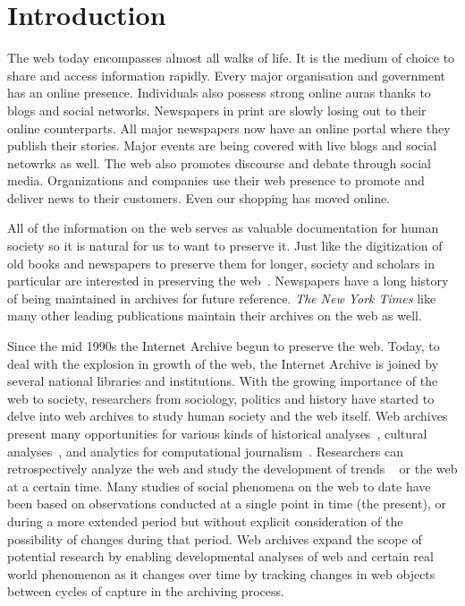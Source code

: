 \chapter{Introduction} %
\label{cha:introduction}


The web today encompasses almost all walks of life. It is the medium of choice to share and access information rapidly. Every major organisation and government has an online presence. Individuals also possess strong online auras thanks to blogs and social networks. Newspapers in print are slowly losing out to their online counterparts. All major newspapers now have an online portal where they publish their stories. Major events are being covered with live blogs and social netowrks as well. The web also promotes discourse and debate through social media. Organizations and companies use their web presence to promote and deliver news to their customers. Even our shopping has moved online. 

All of the information on the web serves as valuable documentation for human society so it is natural for us to want to preserve it. Just like the digitization of old books and newspapers to preserve them for longer, society and scholars in particular are interested in preserving the web~\cite{ross2000changing}. Newspapers have a long history of being maintained in archives for future reference. \emph{The New York Times} like many other leading publications maintain their archives on the web as well. 


Since the mid 1990s the Internet Archive begun to preserve the web. Today, to deal with the explosion in growth of the web, the Internet Archive is joined by several national libraries and institutions. With the growing importance of the web to society, researchers from sociology, politics and history have started to delve into web archives to study human society and the web itself. Web archives present many opportunities for various kinds of historical analyses~\cite{schreibman2008companion}, cultural analyses~\cite{toyoda2003extracting}, and analytics for computational journalism~\cite{cohen2011computational}. Researchers can retrospectively analyze the web and study the development of trends ~\cite{kumar2005bursty} or the web at a certain time. Many studies of social phenomena on the web to date have been based on observations conducted at a single point in time (the present), or during a more extended period but without explicit consideration of the possibility of changes during that period. Web archives expand the scope of potential research by enabling developmental analyses of web and certain real world phenomenon as it changes over time by tracking changes in web objects between cycles of capture in the archiving process.

